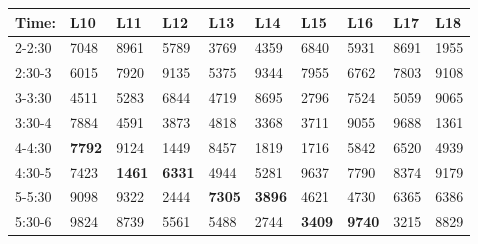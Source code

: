\documentclass[green]{elementals}
\begin{document}
\begin{tabular}{ l || l |  l | l | l | l | l | l | l | l |}
  Time: & L10 & L11 & L12 & L13 & L14 & L15 & L16 & L17 & L18  \\ \hline \hline
  2-2:30 & 7048 & 8961 & 5789 & 3769 & 4359 & 6840 & 5931 & 8691 & 1955  \\ \hline
  2:30-3 & 6015 & 7920 & 9135 & 5375 & 9344 & 7955 & 6762 & 7803 & 9108  \\ \hline
  3-3:30 & 4511 & 5283 & 6844 & 4719 & 8695 & 2796 & 7524 & 5059 & 9065  \\ \hline
  3:30-4 & 7884 & 4591 & 3873 & 4818 & 3368 & 3711 & 9055 & 9688 & 1361  \\ \hline
  4-4:30 & {\bf 7792} & 9124& 1449 & 8457 & 1819 & 1716 & 5842 & 6520 & 4939  \\ \hline
  4:30-5 & 7423 & {\bf 1461} & {\bf 6331} & 4944 & 5281 & 9637 & 7790 & 8374 & 9179  \\ \hline
  5-5:30 & 9098 & 9322 & 2444 & {\bf 7305} & {\bf 3896} & 4621 & 4730 & 6365 & 6386  \\ \hline
  5:30-6 & 9824 & 8739 & 5561 & 5488 & 2744 & {\bf 3409} & {\bf 9740} & 3215 & 8829  \\ \hline
\end{tabular}
\end{document}
